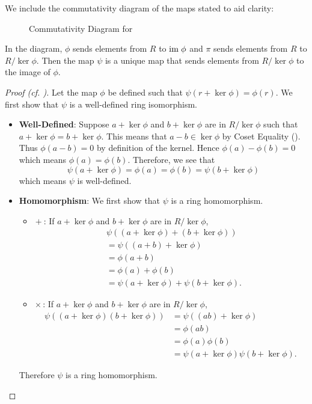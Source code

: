 We include the commutativity diagram of the maps stated to aid clarity:
\begin{figure}[h]
    \centering
    \caption{Commutativity Diagram for }
\end{figure}

In the diagram, $\phi$ sends elements from $R$ to $\mathrm{im}\;\phi$ and $\pi$ sends elements from $R$ to $R/\ker\phi$. Then the map $\psi$ is a unique map that sends elements from $R/\ker\phi$ to the image of $\phi$.

\begin{proof}[Proof (cf. {\cite[p.~302, Factor Theorem For Rings]{cohn_1982}})]
    Let the map $\phi$ be defined such that $\psi(r + \ker\phi) = \phi(r)$. We first show that $\psi$ is a well-defined ring isomorphism.
    \begin{itemize}
        \item \textbf{Well-Defined}: Suppose $a + \ker\phi$ and $b + \ker\phi$ are in $R/\ker\phi$ such that $a + \ker\phi = b+\ker\phi$. This means that $a - b \in \ker\phi$ by Coset Equality (). Thus $\phi(a-b) = 0$ by definition of the kernel. Hence $\phi(a) - \phi(b) = 0$ which means $\phi(a) = \phi(b)$. Therefore, we see that
        \[
            \psi(a + \ker\phi) = \phi(a) = \phi(b) = \psi(b + \ker\phi)
        \]
        which means $\psi$ is well-defined.

        \item \textbf{Homomorphism}: We first show that $\psi$ is a ring homomorphism.
        \begin{itemize}
            \item $\boxed{+}$: If $a + \ker\phi$ and $b + \ker\phi$ are in $R/\ker\phi$,
            \begin{align*}
                &\psi((a + \ker\phi)+(b+\ker\phi))\\
                &= \psi((a+b)+\ker\phi)\\
                &= \phi(a+b)\\
                &= \phi(a) + \phi(b)\\
                &= \psi(a + \ker\phi) + \psi(b + \ker\phi).
            \end{align*}
            \item $\boxed{\times}$: If $a + \ker\phi$ and $b + \ker\phi$ are in $R/\ker\phi$,
            \begin{align*}
                \psi((a + \ker\phi)(b+\ker\phi)) &= \psi((ab)+\ker\phi)\\
                &= \phi(ab)\\
                &= \phi(a)\phi(b)\\
                &= \psi(a + \ker\phi)\psi(b + \ker\phi).
            \end{align*}
        \end{itemize}
        Therefore $\psi$ is a ring homomorphism.


\end{itemize}
\end{proof}
